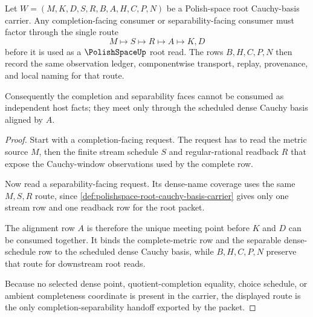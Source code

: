 \begin{theorem}
\label{thm:polishspace-root-completion-separability-handoff}
Let $W=(M,K,D,S,R,B,A,H,C,P,N)$ be a Polish-space root Cauchy-basis carrier. Any completion-facing consumer or separability-facing consumer must factor through the single route
$$
M \longmapsto S \longmapsto R \longmapsto A \longmapsto K,D
$$
before it is used as a $\PolishSpaceUp$ root read. The rows $B,H,C,P,N$ then record the same observation ledger, componentwise transport, replay, provenance, and local naming for that route.

Consequently the completion and separability faces cannot be consumed as independent host facts; they meet only through the scheduled dense Cauchy basis aligned by $A$.
\end{theorem}
\begin{proof}
Start with a completion-facing request. The request has to read the metric source $M$, then the finite stream schedule $S$ and regular-rational readback $R$ that expose the Cauchy-window observations used by the complete row.

Now read a separability-facing request. Its dense-name coverage uses the same $M,S,R$ route, since \autoref{def:polishspace-root-cauchy-basis-carrier} gives only one stream row and one readback row for the root packet.

The alignment row $A$ is therefore the unique meeting point before $K$ and $D$ can be consumed together. It binds the complete-metric row and the separable dense-schedule row to the scheduled dense Cauchy basis, while $B,H,C,P,N$ preserve that route for downstream root reads.

Because no selected dense point, quotient-completion equality, choice schedule, or ambient completeness coordinate is present in the carrier, the displayed route is the only completion-separability handoff exported by the packet.
\end{proof}

